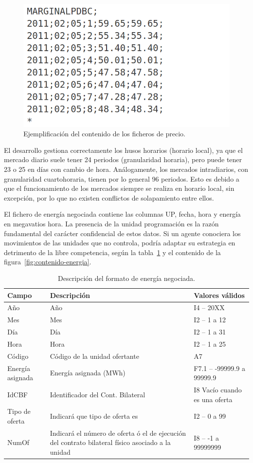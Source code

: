 \begin{figure}
  \centering
  \includegraphics[width=0.5\linewidth]{figures/contenido-precio.png}
  \caption{Ejemplificación del contenido de los ficheros de precio.}
  \label{fig:contenido-precio}
\end{figure}

El desarrollo gestiona correctamente los husos horarios (horario local), ya que el mercado diario suele tener 24 periodos (granularidad horaria), pero puede tener 23 o 25 en días con cambio de hora. Análogamente, los mercados intradiarios, con granularidad cuartohoraria, tienen por lo general 96 periodos. Esto es debido a que el funcionamiento de los mercados siempre se realiza en horario local, sin excepción, por lo que no existen conflictos de solapamiento entre ellos.

El fichero de energía negociada contiene las columnas UP, fecha, hora y energía en megavatios hora. La presencia de la unidad programación es la razón fundamental del carácter confidencial de estos datos. Si un agente conociera los movimientos de las unidades que no controla, podría adaptar su estrategia en detrimento de la libre competencia, según la tabla~\ref{tab:descripción-energia} y el contenido de la figura~\ref{fig:contenido-energia}.

\begin{table}[ht]
  \centering
  \begin{tabular}{|l|p{5cm}|l|}
    \hline
    Campo & Descripción & Valores válidos\\
    \hline
    Año & Año & I4 -- 20XX\\
    Mes & Mes & I2 -- 1 a 12\\
    Día & Día & I2 -- 1 a 31\\
    Hora & Hora & I2 -- 1 a 25\\
    Código & Código de la unidad ofertante & A7\\
    Energía asignada & Energía asignada (MWh) & F7.1 – -99999.9 a 99999.9\\
    IdCBF & Identificador del Cont. Bilateral & I8 Vacío cuando es una oferta\\
    Tipo de oferta & Indicará que tipo de oferta es & I2 – 0 a 99\\
    NumOf & Indicará el número de oferta ó el de ejecución del contrato bilateral físico asociado a la unidad & I8 – -1 a 99999999\\
    \hline
  \end{tabular}
  \caption{Descripción del formato de energía negociada.}
  \label{tab:descripción-energia}
\end{table}

